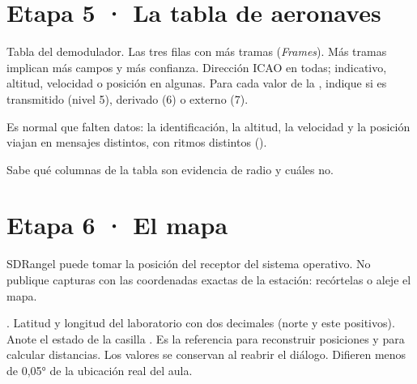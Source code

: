 \section{Etapa 5 · La tabla de aeronaves}
\label{sec:u-tabla}


{Tabla del demodulador.}
{Las tres filas con más tramas (\emph{Frames}).}
{Más tramas implican más campos y más confianza.}
{Dirección ICAO en todas; indicativo, altitud, velocidad o posición en algunas.}
{Para cada valor de la , indique si es transmitido (nivel 5), derivado (6) o externo (7).}
{}

Es normal que falten datos: la identificación, la altitud, la velocidad y la posición viajan en mensajes distintos, con ritmos distintos ().

\begin{logro}
Sabe qué columnas de la tabla son evidencia de radio y cuáles no.
\end{logro}

\section{Etapa 6 · El mapa}
\label{sec:u-mapa}


\begin{importante}[Privacidad]
SDRangel puede tomar la posición del receptor del sistema operativo. No publique capturas con las coordenadas exactas de la estación: recórtelas o aleje el mapa.
\end{importante}

{.}
{Latitud y longitud del laboratorio con dos decimales (norte y este positivos). Anote el estado de la casilla .}
{Es la referencia para reconstruir posiciones y para calcular distancias.}
{Los valores se conservan al reabrir el diálogo.}
{Difieren menos de 0,05° de la ubicación real del aula.}
{}

